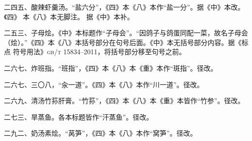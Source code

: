 \begin{list}{}
二四五、酸辣虾羹汤。“盐六分”，《四》本《八》本作“盐一分”。据《中》本改。《四》
本《八》本无脚注{\footnotesize{}}。
据《中》本补。

二五三、子母烩。《中》本标题作“子母会”。“因鸽子与鸽蛋同配一菜，故名子母会
（烩）。”《四》本《八》本括号部分在句号后面。《中》本无括号部分内容。据《标点
符号用法》\textsc{gb/t 15834--2011}，将括号部分移至句号之前。

二六七、炸班指。“班指”，《四》本《八》本《重》本作“斑指”。径改。

二六七、三〇八，“汆一道”。《四》本《八》本作“川一道”。径改。

二六九、清汤竹荪肝膏。“竹荪”，《四》本《八》本《重》本皆作“竹参”。径改。

二七三、旱蒸鱼。各本标题皆作“汗蒸鱼”。径改。

二九二、奶汤素烩。“莴笋”，《四》本《八》本作“窝笋”。径改。

\end{list}
\endgroup%

